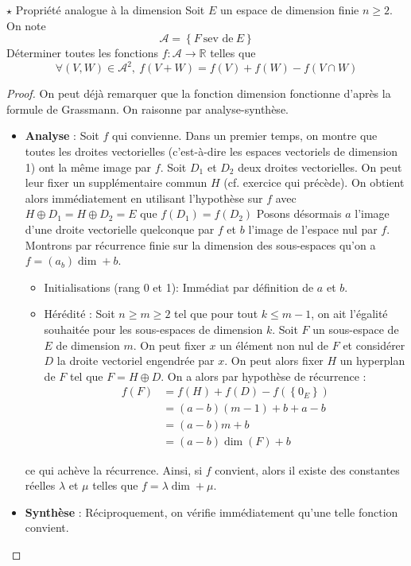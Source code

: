 \documentclass[french,a4paper]{article}
\newcommand{\R}{\mathbb{R}}
\theoremstyle{plain}
\theoremstyle{definition}
\theoremstyle{remark}
\begin{document}
\begin{ex}{$\star$ Propriété analogue à la dimension}
	Soit $E$ un espace de dimension finie $n \geqslant2$. On note $$\mathcal{A}=\left\{F \ \text{sev de} \ E\right\}$$ Déterminer toutes les fonctions $f : \mathcal{A} \longrightarrow \R$ telles que $$ \forall (V,W) \in \mathcal{A}^2, \ f(V+W)=f(V)+f(W)-f(V \cap W)$$
\end{ex}
\begin{proof}
	On peut déjà remarquer que la fonction dimension fonctionne d'après la formule de Grassmann. On raisonne par analyse-synthèse.
	\begin{itemize}
		\item \textbf{Analyse} : Soit $f$ qui convienne. Dans un premier temps, on montre que toutes les droites vectorielles (c'est-à-dire les espaces vectoriels de dimension 1) ont la même image par $f$. Soit $D_1$ et $D_2$ deux droites vectorielles. On peut leur fixer un supplémentaire commun $H$ (cf. exercice qui précède). On obtient alors immédiatement en utilisant l'hypothèse sur $f$ avec $H\oplus D_1=H\oplus D_2=E$ que $f(D_1)=f(D_2)$ Posons désormais $a$ l'image d'une droite vectorielle quelconque par $f$ et $b$ l'image de l'espace nul par $f$. Montrons par récurrence finie sur la dimension des sous-espaces qu'on a $f=(a_b)\dim +b$. 
		\begin{itemize}
			\item Initialisations (rang 0 et 1): Immédiat par définition de $a$ et $b$. 
			\item Hérédité : Soit $n\geqslant m\geqslant 2$ tel que pour tout $k\leqslant m-1$, on ait l'égalité souhaitée pour les sous-espaces de dimension $k$. Soit $F$ un sous-espace de $E$ de dimension $m$. On peut fixer $x$ un élément non nul de $F$ et considérer $D$ la droite vectoriel engendrée par $x$. On peut alors fixer $H$ un hyperplan de $F$ tel que $F=H\oplus D$. On a alors par hypothèse de récurrence :
			\begin{align*}
				f(F)&=f(H)+f(D)-f(\left\{0_E\right\}) \\
				&=(a-b)(m-1)+b +a-b \\
				&=(a-b)m+b \\
				&=(a-b)\dim(F)+b
			\end{align*}
		\end{itemize}
		ce qui achève la récurrence. Ainsi, si $f$ convient, alors il existe des constantes réelles $\lambda$ et $\mu$ telles que $f=\lambda \dim + \mu$.
		\item \textbf{Synthèse} : Réciproquement, on vérifie immédiatement qu'une telle fonction convient.
	\end{itemize}
\end{proof}
\end{document}
